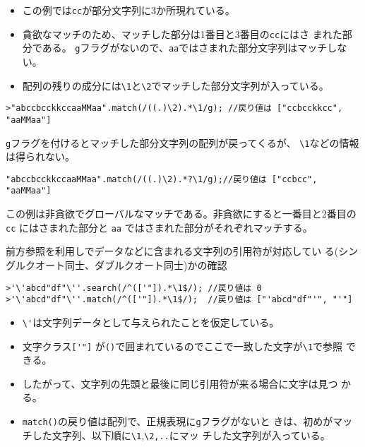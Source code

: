 \begin{Exec}
\begin{Verbatim}
\end{Verbatim}
\begin{itemize}
 \item この例では\Verb+cc+が部分文字列に3か所現れている。
 \item 貪欲なマッチのため、マッチした部分は1番目と3番目の\Verb+cc+にはさ
       まれた部分である。
       \Verb+g+フラグがないので、\Verb+aa+ではさまれた部分文字列はマッチしない。
 \item 配列の残りの成分には\Verb+\1+と\Verb+\2+でマッチした部分文字列が入っている。
\end{itemize}
\begin{Verbatim}
>"abccbcckkccaaMMaa".match(/((.)\2).*\1/g); //戻り値は ["ccbcckkcc", "aaMMaa"]
\end{Verbatim}
 \Verb+g+フラグを付けるとマッチした部分文字列の配列が戻ってくるが、
 \Verb+\1+などの情報は得られない。
\begin{Verbatim}
"abccbcckkccaaMMaa".match(/((.)\2).*?\1/g);//戻り値は ["ccbcc", "aaMMaa"]
\end{Verbatim}
この例は非貪欲でグローバルなマッチである。非貪欲にすると一番目と2番目の
 \Verb+cc+ にはさまれた部分と \Verb+aa+ ではさまれた部分がそれぞれマッチする。

\iffalse\else
 前方参照を利用しでデータなどに含まれる文字列の引用符が対応してい
 る(シングルクオート同士、ダブルクオート同士)かの確認\\
\begin{Verbatim}
>'\'abcd"df"\''.search(/^(['"]).*\1$/); //戻り値は 0
>'\'abcd"df"\''.match(/^(['"]).*\1$/);  //戻り値は ["'abcd"df"'", "'"]
\end{Verbatim}
\begin{itemize}
 \item \Verb+\'+は文字列データとして与えられたことを仮定している。
 \item 文字クラス\Verb+['"]+%
       が\Verb+()+で囲まれているのでここで一致した文字が\Verb+\1+で参照
       できる。
 \item したがって、文字列の先頭と最後に同じ引用符が来る場合に文字は見つ
       かる。
 \item \Verb+match()+の戻り値は配列で、正規表現に\Verb+g+フラグがないと
       きは、初めがマッチした文字列、以下順に\Verb+\1+,\Verb+\2,..+にマッ
       チした文字列が入っている。
\end{itemize}
  \fi
 \end{Exec}
